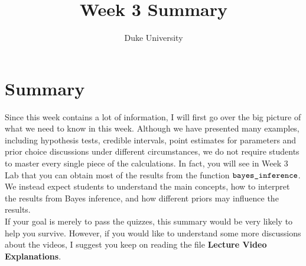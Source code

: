 \documentclass{article}
\begin{document}
\title{Week 3 Summary}
\author{Duke University}
\date{}
\maketitle 

\section*{Summary}

Since this week contains a lot of information, I will first go over the big picture of what we need to know in this week. Although we have presented many examples, including hypothesis tests, credible intervals, point estimates for parameters and prior choice discussions under different circumstances, we do not require students to master every single piece of the calculations. In fact, you will see in Week 3 Lab that you can obtain most of the results from the function $\verb|bayes_inference|$. We instead expect students to understand the main concepts, how to interpret the results from Bayes inference, and how different priors may influence the results.\\

If your goal is merely to pass the quizzes, this summary would be very likely to help you survive. However, if you would like to understand some more discussions about the videos, I suggest you keep on reading the file \textbf{Lecture Video Explanations}.
\end{document}
